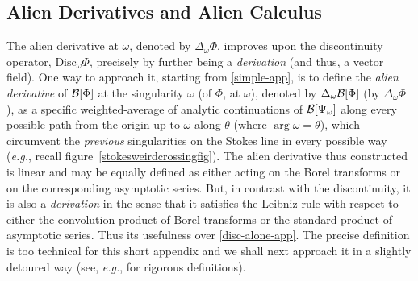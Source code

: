 \documentclass[11pt,a4paper]{article}
\newcommand{\CB}{{\cal B}}
\def\disc{{\mathrm{Disc}}}
\begin{document}
\subsection*{Alien Derivatives and Alien Calculus}

The alien derivative at $\omega$, denoted by $\Delta_\omega \Phi$, improves upon the  discontinuity operator, $\disc_\omega \Phi$, precisely by further being a \textit{derivation} (and thus, a vector field). One way to approach it, starting from \eqref{simple-app}, is to define the \textit{alien derivative} of $\CB [\Phi]$ at the singularity $\omega$ (of $\Phi$, at $\omega$), denoted by $\Delta_\omega \CB [\Phi]$ (by $\Delta_\omega \Phi$), as a specific weighted-average of analytic continuations of $\CB [\Psi_\omega]$ along every possible path from the origin up to $\omega$ along $\theta$ (where $\arg \omega = \theta$), which circumvent the \textit{previous} singularities on the Stokes line in every possible way (\textit{e.g.}, recall figure~\ref{stokesweirdcrossingfig}). The alien derivative thus constructed is linear and may be equally defined as either acting on the Borel transforms or on the corresponding asymptotic series. But, in contrast with the discontinuity, it is also a \textit{derivation} in the sense that it satisfies the Leibniz rule with respect to either the convolution product of Borel transforms or the standard product of asymptotic series. Thus its usefulness over \eqref{disc-alone-app}. The precise definition is too technical for this short appendix and we shall next approach it in a slightly detoured way (see, \textit{e.g.}, \cite{e81, s07, s14} for rigorous definitions).
\end{document}
